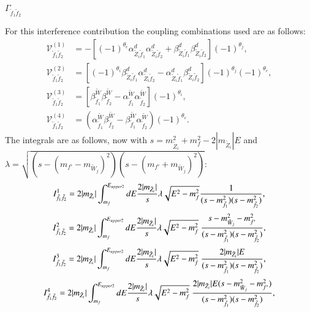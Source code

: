 \documentclass[final,3p,times]{elsarticle}
\begin{document}
\textbf{\underline{$\Gamma_{\tilde{f}_1 \tilde{f}_2}$}}

For this interference contribution the coupling combinations used are as follows:
\begin{align}
\mathcal{V}_{\tilde{f}_1 \tilde{f}_2}^{(1)} &= -[(-1)^{\theta_c}\alpha_{\tilde{Z}_i \tilde{f}_1}^{d}\alpha_{\tilde{Z}_i \tilde{f}_2}^{d} + \beta_{\tilde{Z}_i \tilde{f}_1}^{d} \beta_{\tilde{Z}_i \tilde{f}_2}^{d}](-1)^{\theta_j}, \\
\mathcal{V}_{\tilde{f}_1 \tilde{f}_2}^{(2)} &= [(-1)^{\theta_i}\beta_{\tilde{Z}_i \tilde{f}_1}^{d} \alpha_{\tilde{Z}_i \tilde{f}_2}^{d} - \alpha_{\tilde{Z}_i \tilde{f}_1}^{d} \beta_{\tilde{Z}_i \tilde{f}_2}^{d}](-1)^{\theta_j}(-1)^{\theta_c}, \\
\mathcal{V}_{\tilde{f}_1 \tilde{f}_2}^{(3)} &= [\beta_{\tilde{f}_1}^{\tilde{W}} \beta_{\tilde{f}_2}^{\tilde{W}} - \alpha_{\tilde{f}_1}^{\tilde{W}} \alpha_{\tilde{f}_2}^{\tilde{W}}](-1)^{\theta_i}, \\
\mathcal{V}_{\tilde{f}_1 \tilde{f}_2}^{(4)} &= (\alpha_{\tilde{f}_1}^{\tilde{W}}\beta_{\tilde{f}_2}^{\tilde{W}} - \beta_{\tilde{f}_1}^{\tilde{W}} \alpha_{\tilde{f}_2}^{\tilde{W}})(-1)^{\theta_c}.
\end{align}
The integrals are as follows, now with $s = m_{\tilde{Z}_i}^2 + m_{f}^2 - 2|m_{\tilde{Z}_i}|E$ and $\lambda = \sqrt{(s - (m_{f'}-m_{\tilde{W}_j})^2)(s - (m_{f'}+m_{\tilde{W}_j})^2)}$:
\begin{equation}
I_{\tilde{f}_1 \tilde{f}_2}^{1} = 2|m_{\tilde{Z}_i}| \int_{m_{f}}^{E_{upper2}} dE {2|m_{\tilde{Z}_i}| \over s} \lambda \sqrt{E^2 - m_{f}^2} {1 \over (s-m_{\tilde{f}_1}^2)(s-m_{\tilde{f}_2}^2)},
\end{equation}
\begin{equation}
I_{\tilde{f}_1 \tilde{f}_2}^{2} = 2|m_{\tilde{Z}_i}| \int_{m_{f}}^{E_{upper2}} dE {2|m_{\tilde{Z}_i}| \over s} \lambda \sqrt{E^2 - m_{f}^2} \ {s- m_{\tilde{W}_j}^2 - m_{f'}^2 \over (s-m_{\tilde{f}_1}^2)(s-m_{\tilde{f}_2}^2)},
\end{equation}
\begin{equation}
I_{\tilde{f}_1 \tilde{f}_2}^{3} = 2|m_{\tilde{Z}_i}| \int_{m_{f}}^{E_{upper2}} dE {2|m_{\tilde{Z}_i}| \over s} \lambda \sqrt{E^2 - m_{f}^2} \ {2|m_{\tilde{Z}_i}| E \over (s-m_{\tilde{f}_1}^2)(s-m_{\tilde{f}_2}^2)},
\end{equation}
\begin{equation}
I_{\tilde{f}_1 \tilde{f}_2}^{4} = 2|m_{\tilde{Z}_i}| \int_{m_{f}}^{E_{upper2}} dE {2|m_{\tilde{Z}_i}| \over s} \lambda \sqrt{E^2 - m_{f}^2} \ {2|m_{\tilde{Z}_i}| E (s- m_{\tilde{W}_j}^2 - m_{f'}^2) \over (s-m_{\tilde{f}_1}^2)(s-m_{\tilde{f}_2}^2)},
\end{equation}
\end{document}
